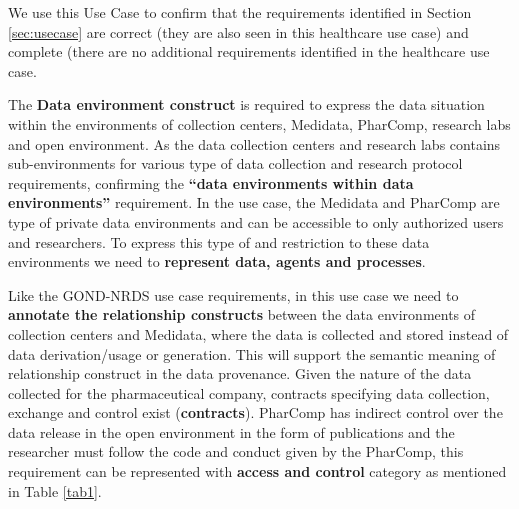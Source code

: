 We use this Use Case to confirm that the requirements identified in Section \ref{sec:usecase} are correct (they are also seen in this healthcare use case) and complete (there are no additional requirements identified in the healthcare use case.

The \textbf{Data environment construct} is required to express the data situation within the environments of collection centers, Medidata, PharComp, research labs and open environment. As the data collection centers and research labs  contains sub-environments for various type of data collection and research protocol requirements, confirming the \textbf{“data environments within data environments”} requirement. In the use case, the Medidata and PharComp are type of private data environments and can be accessible to only authorized users and researchers. To express this type of and restriction to these data environments we need to \textbf{represent data, agents and processes}.  

Like the GOND-NRDS use case requirements, in this use case we need to \textbf{annotate the relationship constructs} between the data environments of collection centers and Medidata, where the data is collected and stored instead of data derivation/usage or generation. This will support the semantic meaning of relationship construct in the data provenance. Given the nature of the data collected for the pharmaceutical company, contracts specifying data collection, exchange and control exist (\textbf{contracts}). PharComp has  indirect control over the data release in the open environment in the form of publications and the researcher must follow the code and conduct given by the PharComp, this requirement can be represented with \textbf{access and control} category as mentioned in Table \ref{tab1}. 

